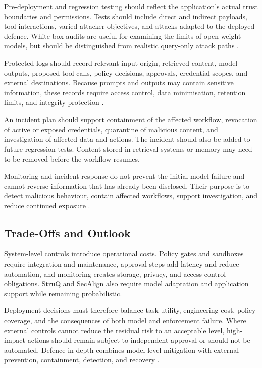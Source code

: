 Pre-deployment and regression testing should reflect the application's actual
trust boundaries and permissions. Tests should include direct and indirect
payloads, tool interactions, varied attacker objectives, and attacks adapted to
the deployed defence. White-box audits are useful for examining the limits of
open-weight models, but should be distinguished from realistic query-only
attack paths
\parencites{debenedetti2024agentdojo}
             {jia2025critical}
             {yang2025checkpointgcg}
             {pandya2025astra}.

Protected logs should record relevant input origin, retrieved content,
model outputs, proposed tool calls, policy decisions, approvals, credential
scopes, and external destinations. Because prompts and outputs may contain
sensitive information, these records require access control, data minimisation,
retention limits, and integrity protection
\parencite{owasp2025llm}.

An incident plan should support containment of the affected workflow,
revocation of active or exposed credentials, quarantine of malicious content,
and investigation of affected data and actions. The incident should also be
added to future regression tests. Content stored in retrieval systems or memory
may need to be removed before the workflow resumes.

Monitoring and incident response do not prevent the initial model failure and
cannot reverse information that has already been disclosed. Their purpose is to
detect malicious behaviour, contain affected workflows, support investigation,
and reduce continued exposure
\parencites{owasp2025llm}{debenedetti2024agentdojo}.

\subsection{Trade-Offs and Outlook}
\label{subsec:deployment-tradeoffs}

System-level controls introduce operational costs. Policy gates and sandboxes
require integration and maintenance, approval steps add latency and reduce
automation, and monitoring creates storage, privacy, and access-control
obligations. StruQ and SecAlign also require model adaptation and application
support while remaining probabilistic.

Deployment decisions must therefore balance task utility, engineering cost,
policy coverage, and the consequences of both model and enforcement failure.
Where external controls cannot reduce the residual risk to an acceptable level,
high-impact actions should remain subject to independent approval or should not
be automated. Defence in depth combines model-level mitigation with external
prevention, containment, detection, and recovery
\parencites{owasp2025llm}
             {wu2024systemlevel}
             {debenedetti2025defeating}.